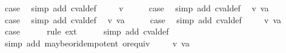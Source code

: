 \begin{isabellebody}
\ {\isacharquery}case\ \isamarkupfalse%
\ {\isacharparenleft}simp\ add{\isacharcolon}\ cval{\isacharunderscore}def{\isacharparenright}\isanewline
{}\isamarkupfalse%
\isanewline
\ \ \isamarkupfalse%
\ {\isacharparenleft}{\isachardoublequoteopen}{}{\isacharunderscore}{}{}{\isachardoublequoteclose}\ v{\isacharparenright}\isanewline
\ \ \isamarkupfalse%
\ \isamarkupfalse%
\ {\isacharquery}case\ \isamarkupfalse%
\ {\isacharparenleft}simp\ add{\isacharcolon}\ cval{\isacharunderscore}def{\isacharparenright}\isanewline
{}\isamarkupfalse%
\isanewline
{}\isamarkupfalse%
\ {\isacharparenleft}{\isachardoublequoteopen}{}{\isacharunderscore}{}{}{\isachardoublequoteclose}\ v\ va{\isacharparenright}\isanewline
\ \ \isamarkupfalse%
\ \isamarkupfalse%
\ {\isacharquery}case\ \isamarkupfalse%
\ {\isacharparenleft}simp\ add{\isacharcolon}\ cval{\isacharunderscore}def{\isacharparenright}\isanewline
{}\isamarkupfalse%
\isanewline
{}\isamarkupfalse%
\ {\isacharparenleft}{\isachardoublequoteopen}{}{\isacharunderscore}{}{}{\isachardoublequoteclose}\ v\ va{\isacharparenright}\isanewline
\ \ \isamarkupfalse%
\ \isamarkupfalse%
\ {\isacharquery}case\ \isamarkupfalse%
\ {\isacharparenleft}simp\ add{\isacharcolon}\ cval{\isacharunderscore}def{\isacharparenright}\isanewline
{}\isamarkupfalse%
\isanewline
\ \ \isamarkupfalse%
\ {\isacharparenleft}{\isachardoublequoteopen}{}{\isacharunderscore}{}{}{\isachardoublequoteclose}\ v\ va{\isacharparenright}\isanewline
\ \ \isamarkupfalse%
\ \isamarkupfalse%
\ {\isacharquery}case\isanewline
\ \ \ \ \isamarkupfalse%
\ {\isacharparenleft}rule\ ext{\isacharparenright}{\isacharplus}\isanewline
\ \ \ \ \isamarkupfalse%
\ {\isacharparenleft}simp\ add{\isacharcolon}\ cval{\isacharunderscore}def{\isacharparenright}\isanewline
\ \ \ \ \isamarkupfalse%
\ {\isacharparenleft}simp\ add{\isacharcolon}\ maybe{\isacharunderscore}or{\isacharunderscore}idempotent\ or{\isacharunderscore}equiv{\isacharparenright}\isanewline
{}\isamarkupfalse%
\isanewline
\ \ \isamarkupfalse%
\ {\isacharparenleft}{\isachardoublequoteopen}{}{\isacharunderscore}{}{}{\isachardoublequoteclose}\ v\ va{\isacharparenright}\isanewline

\end{isabellebody}
